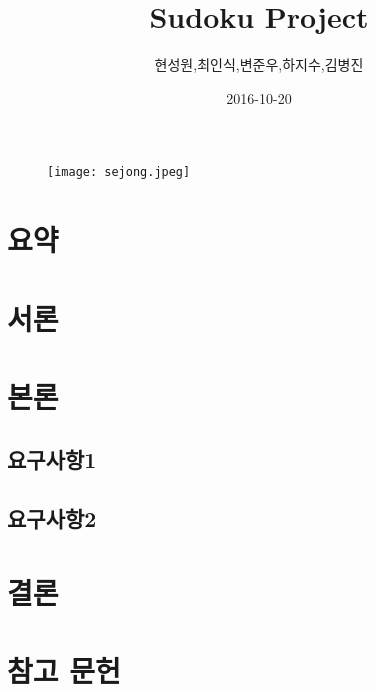 \documentclass{article}
\title{Sudoku Project}
\date{2016-10-20}
\author{현성원,최인식,변준우,하지수,김병진}
\begin{document}
\begin{figure}[b!]
  \texttt{[image: sejong.jpeg]}
\end{figure} 
\maketitle
\newpage
{}

\tableofcontents
\newpage
\section{요약}

\section{서론}

\section{본론}

\subsection{요구사항1}

\subsection{요구사항2}

\section{결론}

\section{참고 문헌}
\end{document}
